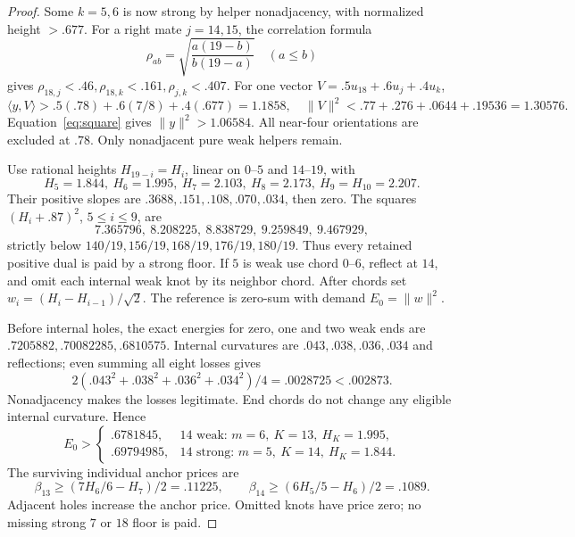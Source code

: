 \documentclass[11pt]{article}
\theoremstyle{definition}
\theoremstyle{remark}
\newcommand{\ip}[2]{\langle #1,#2\rangle}
\newcommand{\norm}[1]{\lVert #1\rVert}
\begin{document}
\begin{proof}
Some \(k=5,6\) is now strong by helper nonadjacency, with
normalized height \(>.677\).
For a right mate \(j=14,15\), the correlation formula
\[
 \rho_{ab}=\sqrt{\frac{a(19-b)}{b(19-a)}}\quad(a\leq b)
\]
gives \(\rho_{18,j}<.46,\rho_{18,k}<.161,\rho_{j,k}<.407\).
For one vector \(V=.5u_{18}+.6u_j+.4u_k\),
\[
 \ip{y}{V}>.5(.78)+.6(7/8)+.4(.677)=1.1858,\quad
 \norm{V}^2<.77+.276+.0644+.19536=1.30576.
\]
Equation~\eqref{eq:square} gives \(\norm{y}^2>1.06584\).
All near-four orientations are excluded at \(.78\).
Only nonadjacent pure weak helpers remain.

Use rational heights \(H_{19-i}=H_i\), linear on \(0\)--\(5\)
and \(14\)--\(19\), with
\[
 H_5=1.844,\ H_6=1.995,\ H_7=2.103,\ H_8=2.173,\
 H_9=H_{10}=2.207.
\]
Their positive slopes are \(.3688,.151,.108,.070,.034\),
then zero. The squares \((H_i+.87)^2\), \(5\leq i\leq9\), are
\[
 7.365796,\ 8.208225,\ 8.838729,\ 9.259849,\ 9.467929,
\]
strictly below \(140/19,156/19,168/19,176/19,180/19\).
Thus every retained positive dual is paid by a strong floor.
If \(5\) is weak use chord \(0\)--\(6\), reflect at \(14\),
and omit each internal weak knot by its neighbor chord.
After chords set \(w_i=(H_i-H_{i-1})/\sqrt2\).
The reference is zero-sum with demand \(E_0=\norm{w}^2\).

Before internal holes, the exact energies for zero, one and
two weak ends are \(.7205882,.70082285,.6810575\).
Internal curvatures are \(.043,.038,.036,.034\) and reflections;
even summing all eight losses gives
\[
 2(.043^2+.038^2+.036^2+.034^2)/4=.0028725<.002873.
\]
Nonadjacency makes the losses legitimate. End chords do not
change any eligible internal curvature. Hence
\begin{equation}
\label{eq:Alocalbase}
 E_0>
 \begin{cases}
 .6781845,&14\text{ weak: }m=6,\ K=13,\ H_K=1.995,\\
 .69794985,&14\text{ strong: }m=5,\ K=14,\ H_K=1.844.
 \end{cases}
\end{equation}
The surviving individual anchor prices are
\[
 \beta_{13}\geq(7H_6/6-H_7)/2=.11225,\qquad
 \beta_{14}\geq(6H_5/5-H_6)/2=.1089.
\]
Adjacent holes increase the anchor price. Omitted knots have
price zero; no missing strong \(7\) or \(18\) floor is paid.


\end{proof}
\end{document}
